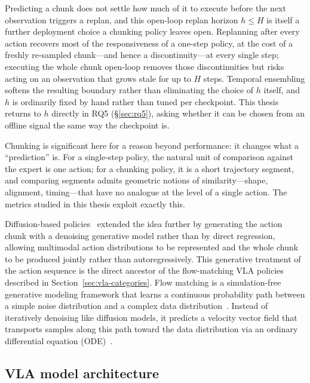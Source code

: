 \documentclass[english,12pt,a4paper,pdftex,elec,utf8]{aaltothesis}
\begin{document}
Predicting a chunk does not settle how much of it to execute before the next observation triggers a replan, and this open-loop replan horizon $h\le H$ is itself a further deployment choice a chunking policy leaves open. Replanning after every action recovers most of the responsiveness of a one-step policy, at the cost of a freshly re-sampled chunk---and hence a discontinuity---at every single step; executing the whole chunk open-loop removes those discontinuities but risks acting on an observation that grows stale for up to $H$ steps. Temporal ensembling softens the resulting boundary rather than eliminating the choice of $h$ itself, and $h$ is ordinarily fixed by hand rather than tuned per checkpoint. This thesis returns to $h$ directly in RQ5 (\S\ref{sec:rq5}), asking whether it can be chosen from an offline signal the same way the checkpoint is.

Chunking is significant here for a reason beyond performance: it changes what a ``prediction'' is. For a single-step policy, the natural unit of comparison against the expert is one action; for a chunking policy, it is a short trajectory segment, and comparing segments admits geometric notions of similarity---shape, alignment, timing---that have no analogue at the level of a single action. The metrics studied in this thesis exploit exactly this.

Diffusion-based policies~\cite{chi2023diffusion} extended the idea further by generating the action chunk with a denoising generative model rather than by direct regression, allowing multimodal action distributions to be represented and the whole chunk to be produced jointly rather than autoregressively. This generative treatment of the action sequence is the direct ancestor of the flow-matching VLA policies described in Section~\ref{sec:vla-categories}. Flow matching is a simulation-free generative modeling framework that learns a continuous probability path between a simple noise distribution and a complex data distribution~\cite{lipman2023flow}. Instead of iteratively denoising like diffusion models, it predicts a velocity vector field that transports samples along this path toward the data distribution via an ordinary differential equation (ODE)~\cite{patel2024exploringdiffusionflowmatching}.

\subsection{VLA model architecture}
\label{subsec:vla-architecture}
\end{document}
